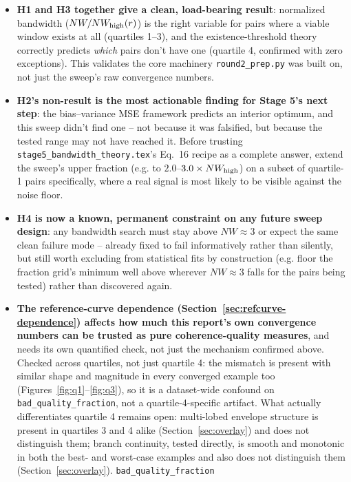 \documentclass[11pt]{article}
\begin{document}
\begin{itemize}[nosep]
  \item \textbf{H1 and H3 together give a clean, load-bearing result}: normalized bandwidth
    ($NW/NW_{\rm high}(r)$) is the right variable for pairs where a viable window exists at all
    (quartiles 1--3), and the existence-threshold theory correctly predicts \emph{which} pairs
    don't have one (quartile 4, confirmed with zero exceptions). This validates the core
    machinery \texttt{round2\_prep.py} was built on, not just the sweep's raw convergence numbers.
  \item \textbf{H2's non-result is the most actionable finding for Stage 5's next step}: the
    bias--variance MSE framework predicts an interior optimum, and this sweep didn't find one --
    not because it was falsified, but because the tested range may not have reached it. Before
    trusting \texttt{stage5\_bandwidth\_theory.tex}'s Eq.~16 recipe as a complete answer, extend
    the sweep's upper fraction (e.g. to $2.0$--$3.0\times NW_{\rm high}$) on a subset of quartile-1
    pairs specifically, where a real signal is most likely to be visible against the noise floor.
  \item \textbf{H4 is now a known, permanent constraint on any future sweep design}: any bandwidth
    search must stay above $NW\approx 3$ or expect the same clean failure mode -- already fixed to
    fail informatively rather than silently, but still worth excluding from statistical fits by
    construction (e.g. floor the fraction grid's minimum well above wherever $NW\approx 3$ falls
    for the pairs being tested) rather than discovered again.
  \item \textbf{The reference-curve dependence (Section~\ref{sec:refcurve-dependence}) affects
    how much this report's own convergence numbers can be trusted as pure coherence-quality
    measures}, and needs its own quantified check, not just the mechanism confirmed above. Checked
    across quartiles, not just quartile 4: the mismatch is present with similar shape and magnitude
    in every converged example too (Figures~\ref{fig:q1}--\ref{fig:q3}), so it is a
    dataset-wide confound on \texttt{bad\_quality\_fraction}, not a quartile-4-specific artifact.
    What actually differentiates quartile 4 remains open: multi-lobed envelope structure is present
    in quartiles 3 and 4 alike (Section~\ref{sec:overlay}) and does not distinguish them; branch
    continuity, tested directly, is smooth and monotonic in both the best- and worst-case examples
    and also does not distinguish them (Section~\ref{sec:overlay}). \texttt{bad\_quality\_fraction}

\end{itemize}
\end{document}

